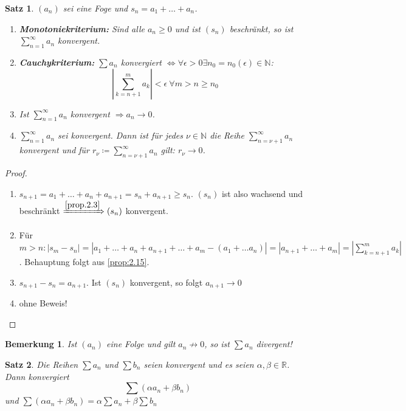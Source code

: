 \documentclass[titlepage,ngerman,a4paper,headsepline,DIV15,halfparskip*,14pt]{scrartcl}
\newcommand{\R}{\mathbb{R}}
\newcommand{\N}{\mathbb{N}}
\theoremstyle{dotless}
\newtheorem{satz}{Satz}[section]
\newtheorem*{bemerkung}{Bemerkung}
\begin{document}
 
\begin{satz} \label{satz:3.1} 
	$(a_{n})$ sei eine Foge und $s_{n} = a_{1} + \dotsc + a_{n}$.
	\begin{enumerate}
		\item \textbf{Monotoniekriterium:} Sind alle $a_{n} \geq 0$ und ist $(s_{n})$ beschränkt, so ist $\sum_{n = 1}^{\infty} a_{n}$ konvergent.
		\item \textbf{Cauchykriterium:} $\sum a_{n}$ konvergiert $\iff \forall \epsilon > 0 \exists n_{0} = n_{0}(\epsilon) \in \N$:
			$$ \left| \sum_{k = n+1}^{m} a_{k} \right| < \epsilon ~\forall m > n \geq n_{0} $$
		\item Ist $\sum_{n=1}^{\infty} a_{n}$ konvergent $\Rightarrow a_{n} \rightarrow 0$.
		\item $\sum_{n=1}^{\infty} a_{n}$ sei konvergent. Dann ist für jedes $\nu \in \N$ die Reihe $\sum_{n=\nu+1}^{\infty} a_{n}$ konvergent und für $r_{\nu} \coloneqq \sum_{n = \nu+1}^{\infty} a_{n}$ gilt: $r_{\nu} \rightarrow 0$.
	\end{enumerate}
\end{satz}

\begin{proof} ~\
	\begin{enumerate}
		\item $s_{n+1} = a_{1} + \dotsc + a_{n} + a_{n+1} = s_{n} + a_{n+1} \geq s_{n}$. $(s_{n})$ ist also wachsend und beschränkt $\xRightarrow[]{\ref{prop.2.3}} (s_{n})$ konvergent.
		\item Für $m > n: |s_{m} - s_{n}| = | a_{1} + \dotsc + a_{n} + a_{n+1} + \dotsc + a_{m} - (a_{1} + \dotsc a_{n})| = |a_{n+1} + \dotsc + a_{m}| = |\sum_{k=n+1}^{m} a_{k}|$. Behauptung folgt aus \ref{prop:2.15}.
		\item $s_{n+1} - s_{n} = a_{n+1}$. Ist $(s_{n})$ konvergent, so folgt $a_{n+1} \rightarrow 0$
		\item ohne Beweis!
	\end{enumerate}	
\end{proof}


\begin{bemerkung}
	Ist $(a_{n})$ eine Folge und gilt $a_{n} \not\rightarrow 0$, so ist $\sum a_{n}$ divergent!
\end{bemerkung}


\begin{satz} \label{satz:3.2}
	Die Reihen $\sum a_{n}$ und $\sum b_{n}$ seien konvergent und es seien $\alpha, \beta \in \R$. Dann konvergiert
		$$ \sum ( \alpha a_{n} + \beta b_{n}) $$
	und $\sum ( \alpha a_{n} + \beta b_{n}) = \alpha \sum a_{n} + \beta \sum b_{n}$
\end{satz}
\end{document}
